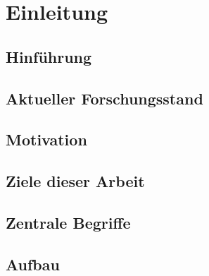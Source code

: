 \chapter{Einleitung}
\label{cha:Einleitung}

\section{Hinf\"uhrung}
\label{sec:hinfuhrung}

\section{Aktueller Forschungsstand}
\label{sec:aktueller_forschungsstand}

\section{Motivation}
\label{sec:motivation}

\section{Ziele dieser Arbeit}
\label{sec:ziele_dieser_arbeit}

\section{Zentrale Begriffe}
\label{sec:zentrale_begriffe}

\section{Aufbau}
\label{sec:aufbau}
